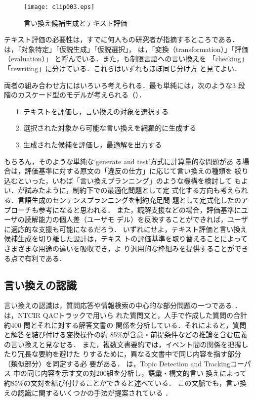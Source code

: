 \begin{figure}[t]
\begin{center}
\leavevmode
\texttt{[image: clip003.eps]}
\caption{言い換え候補生成とテキスト評価}
\label{fig:gen-and-eval}
\end{center}
\end{figure}

テキスト評価の必要性は，すでに何人もの研究者が指摘するところである．
は，「対象特定」「仮説生成」「仮説選択」，
は，「変換（transformation）」「評価（evaluation）」
と呼んでいる．また，も制限言語への言い換えを
「checking」「rewriting」に分けている．これらはいずれもほぼ同じ分け方
と見てよい．

両者の組み合わせ方にはいろいろ考えられる．最も単純には，次のような3 段
階のカスケード型のモデルが考えられる（）．
\begin{itemize}
\item[1.] テキストを評価し，言い換えの対象を選択する
\item[2.] 選択された対象から可能な言い換えを網羅的に生成する
\item[3.] 生成された候補を評価し，最適解を出力する
\end{itemize}
もちろん，そのような単純な`generate and test'方式に計算量的な問題があ
る場合は，評価基準に対する原文の「違反の仕方」に応じて言い換えの種類を
絞り込むといった，いわば「言い換えプランニング」のような機構を検討して
もよい．が試みたように，制約下での最適化問題として定
式化する方向も考えられる．言語生成のセンテンスプランニングを制約充足問
題として定式化したのアプローチも参考になると思われる．
また，読解支援などの場合，評価基準にユーザの読解能力の個人差（ユーザモ
デル）を反映することができれば，ユーザに適応的な支援も可能になるだろう．
いずれにせよ，テキスト評価と言い換え候補生成を切り離した設計は，テキス
トの評価基準を取り替えることによってさまざまな用途の違いを吸収でき，よ
り汎用的な枠組みを提供することができる点で有利である．

\subsection{言い換えの認識}
\label{ssec:recognition}

言い換えの認識は，質問応答や情報検索の中心的な部分問題の一つである
\cite{shiraki:00:a,kurohashi:01,lin:01,ravichandran:02,sasaki:02,hermjakob:02,duclaye:03,moldovan:03,takahashi:03:c,takahashi:04:a}．
は，NTCIR QACトラック\cite{fukumoto:02}で用いら
れた質問文と，人手で作成した質問の合計約400 問とそれに対する解答文書の
関係を分析している．それによると，質問と解答を結び付ける変換操作の約
85\%が含意・前提条件などの推論を含む広義の言い換えと見なせる．
また，複数文書要約では，イベント間の関係を把握したり冗長な要約を避けた
りするために，異なる文書中で同じ内容を指す部分（類似部分）を同定する必
要がある．
は，Topic Detection and Trackingコーパス
\cite{allan:98}中の同じ内容を示す文の対200組を分析し，語彙・構文的言い
換えによって約85\%の文対を結び付けることができると述べている．
この文脈でも，言い換えの認識に関するいくつかの手法が提案されている
\cite{mckeown:99,barzilay:99,ueda:00,narimatsu:02,barzilay:03:c}．


